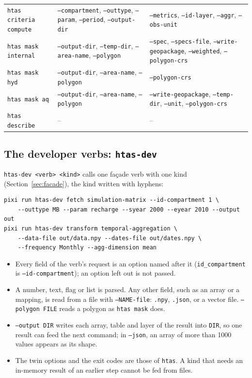 \documentclass[11pt]{article}
\begin{document}
\begin{center}
\begin{tabularx}{\textwidth}{>{\raggedright\arraybackslash}l >{\raggedright\arraybackslash}X >{\raggedright\arraybackslash}X}
\texttt{htas criteria compute} & \texttt{--compartment}, \texttt{--outtype}, \texttt{--param}, \texttt{--period}, \texttt{--output-dir} & \texttt{--metrics}, \texttt{--id-layer}, \texttt{--aggr}, \texttt{--obs-unit} \\
\texttt{htas mask internal} & \texttt{--output-dir}, \texttt{--temp-dir}, \texttt{--area-name}, \texttt{--polygon} & \texttt{--spec}, \texttt{--specs-file}, \texttt{--write-geopackage}, \texttt{--weighted}, \texttt{--polygon-crs} \\
\texttt{htas mask hyd} & \texttt{--output-dir}, \texttt{--area-name}, \texttt{--polygon} & \texttt{--polygon-crs} \\
\texttt{htas mask aq} & \texttt{--output-dir}, \texttt{--area-name}, \texttt{--polygon} & \texttt{--write-geopackage}, \texttt{--temp-dir}, \texttt{--unit}, \texttt{--polygon-crs} \\
\texttt{htas describe} & -- & -- \\
\bottomrule
\end{tabularx}
\end{center}


\subsection{The developer verbs: \texttt{htas-dev}}

\texttt{htas-dev <verb> <kind>} calls one façade verb with one kind
(Section~\ref{sec:facade}), the kind written with hyphens:

\begin{verbatim}
pixi run htas-dev fetch simulation-matrix --id-compartment 1 \
    --outtype MB --param recharge --syear 2000 --eyear 2010 --output out
pixi run htas-dev transform temporal-aggregation \
    --data-file out/data.npy --dates-file out/dates.npy \
    --frequency Monthly --agg-dimension mean
\end{verbatim}

\begin{itemize}
    \item Every field of the verb's request is an option named after it (\texttt{id\_compartment} is \texttt{--id-compartment}); an option left out is not passed.
    \item A number, text, flag or list is parsed. Any other field, such as an array or a mapping, is read from a file with \texttt{--NAME-file}: \texttt{.npy}, \texttt{.json}, or a vector file. \texttt{--polygon FILE} reads a polygon as \texttt{htas mask} does.
    \item \texttt{--output DIR} writes each array, table and layer of the result into \texttt{DIR}, so one result can feed the next command; in \texttt{--json}, an array of more than 1000 values appears as its shape.
    \item The twin options and the exit codes are those of \texttt{htas}. A kind that needs an in-memory result of an earlier step cannot be fed from files.
\end{itemize}
\end{document}
